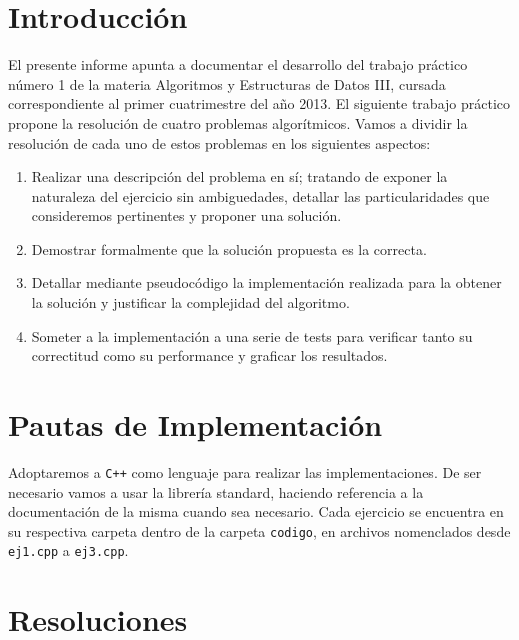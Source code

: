 \documentclass[10pt, a4paper]{article}
\author{Algoritmos y Estructuras de Datos III, DC, UBA.}
\date{}
\title{}
\begin{document}
	
\thispagestyle{empty}
\titulo{}

\maketitle

\tableofcontents
\newpage

\section{Introducci\'on}
El presente informe apunta a documentar el desarrollo del trabajo pr\'actico n\'umero 1 de la materia Algoritmos y Estructuras de Datos III, cursada correspondiente al primer cuatrimestre
del a\~no 2013. El siguiente trabajo pr\'actico propone la resoluci\'on de cuatro problemas algor\'itmicos. Vamos a dividir la resoluci\'on de cada uno de estos problemas en los siguientes aspectos:

\begin{enumerate}
\item Realizar una descripci\'on del problema en s\'i; tratando de exponer la naturaleza del ejercicio sin ambiguedades, detallar las particularidades que consideremos pertinentes y proponer una soluci\'on.
\item Demostrar formalmente que la soluci\'on propuesta es la correcta.
\item Detallar mediante pseudoc\'odigo la implementaci\'on realizada para la obtener la soluci\'on y justificar la complejidad del algoritmo.
\item Someter a la implementaci\'on a una serie de tests para verificar tanto su correctitud como su performance y graficar los resultados.
\end{enumerate}

\section{Pautas de Implementaci\'on}
Adoptaremos a \verb*#C++# como lenguaje para realizar las implementaciones. De ser necesario vamos a usar la librer\'ia standard, haciendo referencia a la documentaci\'on de la misma cuando sea necesario. Cada
ejercicio se encuentra en su respectiva carpeta dentro de la carpeta \verb*#codigo#, en archivos nomenclados desde \verb*#ej1.cpp# a \verb*#ej3.cpp#.
 
\newpage

\section{Resoluciones}

\newpage


\newpage


\newpage
\end{document}
